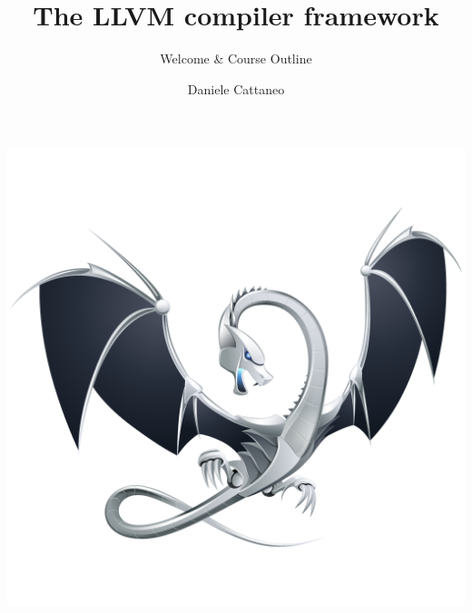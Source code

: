 \documentclass[10pt,mathserif]{beamer}
\author{Daniele Cattaneo}
\institute{Politecnico di Milano}
\date{\DATE}
\title{The LLVM compiler framework}
\subtitle{Welcome \& Course Outline}
\begin{document}
\begin{frame}
\maketitle
\end{frame}

\begin{frame}[plain]{}
  \begin{center}
    \vspace{-.1\textheight}
    \includegraphics[width=\textwidth]{img/logo.png}
  \end{center}
\end{frame}
\end{document}
